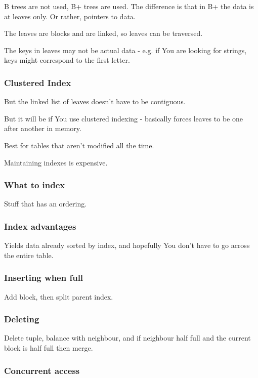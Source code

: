 \documentclass{article}
\begin{document}
				B trees are not used, B+ trees are used. The difference is that in B+ the data is at leaves only. Or rather, pointers to data.
				
				The leaves are blocks and are linked, so leaves can be traversed.
				
				The keys in leaves may not be actual data - e.g. if You are looking for strings, keys might correspond to the first letter.
				
			\subsubsection{Clustered Index}
			
				But the linked list of leaves doesn't have to be contiguous.
				
				But it will be if You use clustered indexing - basically forces leaves to be one after another in memory.
				
				Best for tables that aren't modified all the time.
				
				Maintaining indexes is expensive.
				
			\subsubsection{What to index}
			
				Stuff that has an ordering.
				
			\subsubsection{Index advantages}
			
				Yields data already sorted by index, and hopefully You don't have to go across the entire table.
				
			\subsubsection{Inserting when full}
			
				Add block, then split parent index.
				
			\subsubsection{Deleting}
				
				Delete tuple, balance with neighbour, and if neighbour half full and the current block is half full then merge.
				
			\subsubsection{Concurrent access}
			
\end{document}
